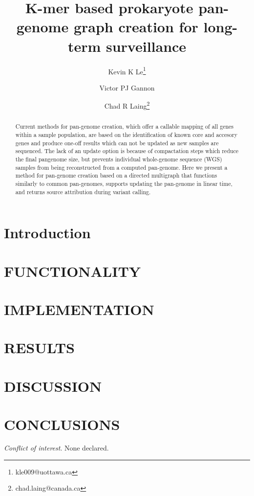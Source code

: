 \documentclass{article}
\begin{document}
\title{K-mer based prokaryote pan-genome graph creation for long-term surveillance}

\author[1]{Kevin K Le\thanks{kle009@uottawa.ca}}
\author[1]{Victor PJ Gannon}
\author[2]{Chad R Laing\thanks{chad.laing@canada.ca}}

\renewcommand\Authands{ and }

\maketitle

\begin{abstract}

Current methods for pan-genome creation, which offer a callable mapping of all genes within a sample population, are based on the identification of known core and accesory genes and produce one-off results which can not be updated as new samples are sequenced.
The lack of an update option is because of compactation steps which reduce the final pangenome size, but prevents individual whole-genome sequence (WGS) samples from being reconstructed from a computed pan-genome.
Here we present a method for pan-genome creation based on a directed multigraph that functions similarly to common pan-genomes, supports updating the pan-genome in linear time, and returns source attribution during variant calling.


\end{abstract}


\section{Introduction}


\enlargethispage{-65.1pt}

\section{FUNCTIONALITY}


\section{IMPLEMENTATION}

\section{RESULTS}

\section{DISCUSSION}


\section{CONCLUSIONS}


\textit{Conflict of interest}. None declared.

\newpage



\end{document}
